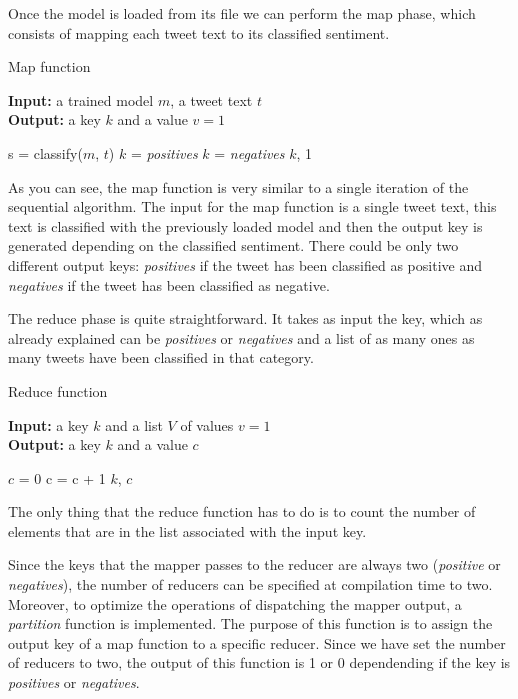 \documentclass[10pt,twocolumn,letterpaper]{article}
\begin{document}
Once the model is loaded from its file we can perform the map phase, which consists of mapping each tweet text to its classified sentiment.

\begin{algorithm}[H]
\caption{Map function}
\textbf{Input:} a trained model $m$, a tweet text $t$ \\
\textbf{Output:} a key $k$ and a value $v = 1$ \\
\begin{algorithmic}
    \State s = classify($m$, $t$)
        \State $k$ = \textit{positives}
    \Else
        \State $k$ = \textit{negatives}
    \EndIf
    \State \Return $k$, 1

\end{algorithmic}
\end{algorithm}

As you can see, the map function is very similar to a single iteration of the sequential algorithm. The input for the map function is a single tweet text, this text is classified with the previously loaded model and then the output key is generated depending on the classified sentiment. There could be only two different output keys: \textit{positives} if the tweet has been classified as positive and \textit{negatives} if the tweet has been classified as negative.

The reduce phase is quite straightforward. It takes as input the key, which as already explained can be \textit{positives} or \textit{negatives} and a list of as many ones as many tweets have been classified in that category.

\begin{algorithm}[H]
\caption{Reduce function}
\textbf{Input:} a key $k$ and a list $V$ of values $v = 1$ \\
\textbf{Output:} a key $k$ and a value $c$ \\
\begin{algorithmic}
    \State $c$ = 0
        \State c = c + 1
    \EndFor
    \State \Return $k$, $c$
\end{algorithmic}
\end{algorithm}

The only thing that the reduce function has to do is to count the number of elements that are in the list associated with the input key.

Since the keys that the mapper passes to the reducer are always two (\textit{positive} or \textit{negatives}), the number of reducers can be specified at compilation time to two. Moreover, to optimize the operations of dispatching the mapper output, a \textit{partition} function is implemented. The purpose of this function is to assign the output key of a map function to a specific reducer. Since we have set the number of reducers to two, the output of this function is 1 or 0 dependending if the key is \textit{positives} or \textit{negatives}.
\end{document}
